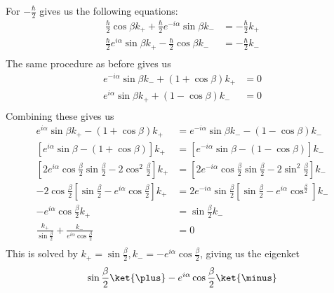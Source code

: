 For $-\frac{\hbar}{2}$ gives us the following equations:
\begin{align*}
  \frac{\hbar}{2}\cos\beta k_{\plus}
  +\frac{\hbar}{2}e^{-i\alpha}\sin\beta k_{\minus} &=
  -\frac{\hbar}{2}k_{\plus} \\
  \frac{\hbar}{2}e^{i\alpha}\sin\beta k_{\plus}
  -\frac{\hbar}{2}\cos\beta k_{\minus} &=
  -\frac{\hbar}{2}k_{\minus} \\
\end{align*}
The same procedure as before gives us
\begin{align*}
  e^{-i\alpha}\sin\beta k_{\minus} + (1 + \cos\beta)k_{\plus} &= 0 \\
  e^{i\alpha}\sin\beta k_{\plus} + (1 - \cos\beta)k_{\minus} &= 0 \\
\end{align*}
Combining these gives us
\begin{align*}
  e^{i\alpha}\sin\beta k_{\plus} - (1 + \cos\beta)k_{\plus} &=
  e^{-i\alpha}\sin\beta k_{\minus} - (1 - \cos\beta)k_{\minus} \\
  [e^{i\alpha}\sin\beta - (1 + \cos\beta)]k_{\plus} &=
  [e^{-i\alpha}\sin\beta - (1 - \cos\beta)]k_{\minus} \\
  \left[2e^{i\alpha}\cos\frac{\beta}{2}\sin\frac{\beta}{2} - 2\cos^2\frac{\beta}{2}\right]k_{\plus}
  &=
  \left[2e^{-i\alpha}\cos\frac{\beta}{2}\sin\frac{\beta}{2} - 2\sin^2\frac{\beta}{2}\right]k_{\minus} \\
  -2\cos\frac{\beta}{2}\left[\sin\frac{\beta}{2} - e^{i\alpha}\cos\frac{\beta}{2}\right]k_{\plus}
  &=
  2e^{-i\alpha}\sin\frac{\beta}{2}\left[\sin\frac{\beta}{2} - e^{i\alpha}\cos^\frac{\beta}{2}\right]k_{\minus} \\
  -e^{i\alpha}\cos\frac{\beta}{2}k_{\plus} &= \sin\frac{\beta}{2}k_{\minus} \\
  \frac{k_{\plus}}{\sin\frac{\beta}{2}} + \frac{k_{\minus}}{e^{i\alpha}\cos\frac{\beta}{2}} &= 0 \\
\end{align*}
This is solved by $k_{\plus} = \sin\frac{\beta}{2}, k_{\minus} =
-e^{i\alpha}\cos\frac{\beta}{2}$, giving us the eigenket
\[ \sin\frac{\beta}{2}\ket{\plus} - e^{i\alpha}\cos\frac{\beta}{2}\ket{\minus} \]
